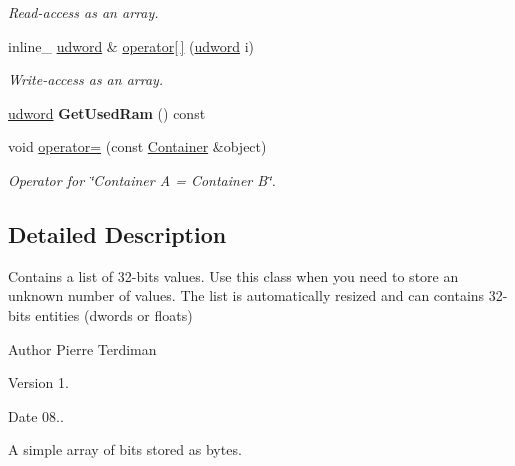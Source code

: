 \begin{DoxyCompactItemize}
\begin{DoxyCompactList}\small\item\em Read-\/access as an array. \end{DoxyCompactList}\item 
\hypertarget{class_container_a8f2ac06a6c0d40eea078c108219d3cfd}{inline\+\_\+ \hyperlink{_ice_types_8h_a44c6f1920ba5551225fb534f9d1a1733}{udword} \& \hyperlink{class_container_a8f2ac06a6c0d40eea078c108219d3cfd}{operator\mbox{[}$\,$\mbox{]}} (\hyperlink{_ice_types_8h_a44c6f1920ba5551225fb534f9d1a1733}{udword} i)}\label{class_container_a8f2ac06a6c0d40eea078c108219d3cfd}

\begin{DoxyCompactList}\small\item\em Write-\/access as an array. \end{DoxyCompactList}\item 
\hypertarget{class_container_a5c3d8b367f025e179ae73aadcc620c51}{\hyperlink{_ice_types_8h_a44c6f1920ba5551225fb534f9d1a1733}{udword} {\bfseries Get\+Used\+Ram} () const }\label{class_container_a5c3d8b367f025e179ae73aadcc620c51}

\item 
\hypertarget{class_container_a15a48bab360df6824d861cf3695112da}{void \hyperlink{class_container_a15a48bab360df6824d861cf3695112da}{operator=} (const \hyperlink{class_container}{Container} \&object)}\label{class_container_a15a48bab360df6824d861cf3695112da}

\begin{DoxyCompactList}\small\item\em Operator for \char`\"{}\+Container A = Container B\char`\"{}. \end{DoxyCompactList}\end{DoxyCompactItemize}


\subsection{Detailed Description}
Contains a list of 32-\/bits values. Use this class when you need to store an unknown number of values. The list is automatically resized and can contains 32-\/bits entities (dwords or floats)

\begin{DoxyAuthor}{Author}
Pierre Terdiman 
\end{DoxyAuthor}
\begin{DoxyVersion}{Version}
1. 
\end{DoxyVersion}
\begin{DoxyDate}{Date}
08..
\end{DoxyDate}
A simple array of bits stored as bytes.

